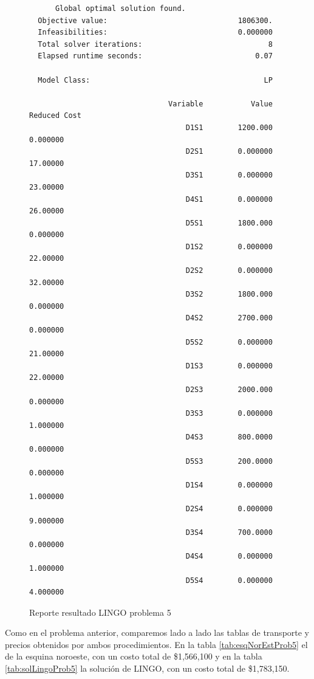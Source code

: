 \documentclass[12pt]{article}  %
\begin{document}
\begin{figure}[H]
	\centering
	\caption{Reporte resultado LINGO problema 5}
	\label{fig:reporteProb5}
	\begin{verbatim}
	  Global optimal solution found.
  Objective value:                              1806300.
  Infeasibilities:                              0.000000
  Total solver iterations:                             8
  Elapsed runtime seconds:                          0.07

  Model Class:                                        LP

                                Variable           Value        Reduced Cost
                                    D1S1        1200.000            0.000000
                                    D2S1        0.000000            17.00000
                                    D3S1        0.000000            23.00000
                                    D4S1        0.000000            26.00000
                                    D5S1        1800.000            0.000000
                                    D1S2        0.000000            22.00000
                                    D2S2        0.000000            32.00000
                                    D3S2        1800.000            0.000000
                                    D4S2        2700.000            0.000000
                                    D5S2        0.000000            21.00000
                                    D1S3        0.000000            22.00000
                                    D2S3        2000.000            0.000000
                                    D3S3        0.000000            1.000000
                                    D4S3        800.0000            0.000000
                                    D5S3        200.0000            0.000000
                                    D1S4        0.000000            1.000000
                                    D2S4        0.000000            9.000000
                                    D3S4        700.0000            0.000000
                                    D4S4        0.000000            1.000000
                                    D5S4        0.000000            4.000000
	\end{verbatim}
\end{figure}

Como en el problema anterior, comparemos lado a lado las tablas de transporte y precios obtenidos por ambos procedimientos. En la tabla \ref{tab:esqNorEstProb5} el de la esquina noroeste, con un costo total de \$1,566,100 y en la tabla \ref{tab:solLingoProb5} la solución de LINGO, con un costo total de \$1,783,150.
\end{document}
